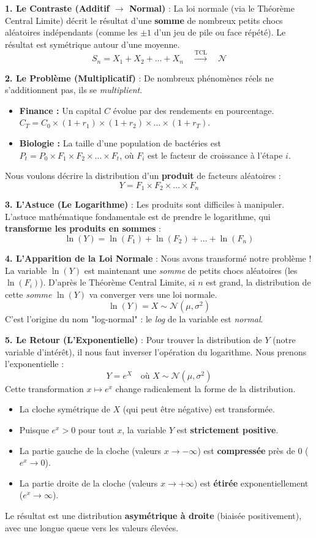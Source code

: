 \begin{intuitionbox}
\textbf{1. Le Contraste (Additif $\to$ Normal)} :
La loi normale (via le Théorème Central Limite) décrit le résultat d'une \textbf{somme} de nombreux petits chocs aléatoires indépendants (comme les $\pm 1$ d'un jeu de pile ou face répété). Le résultat est symétrique autour d'une moyenne.
$$ S_n = X_1 + X_2 + \ldots + X_n \quad \xrightarrow{\text{TCL}} \quad \mathcal{N} $$

\textbf{2. Le Problème (Multiplicatif)} :
De nombreux phénomènes réels ne s'additionnent pas, ils se \textit{multiplient}.
\begin{itemize}
    \item \textbf{Finance :} Un capital $C$ évolue par des rendements en pourcentage. $C_T = C_0 \times (1+r_1) \times (1+r_2) \times \ldots \times (1+r_T)$.
    \item \textbf{Biologie :} La taille d'une population de bactéries est $P_t = P_0 \times F_1 \times F_2 \times \ldots \times F_t$, où $F_i$ est le facteur de croissance à l'étape $i$.
\end{itemize}
Nous voulons décrire la distribution d'un \textbf{produit} de facteurs aléatoires :
$$ Y = F_1 \times F_2 \times \ldots \times F_n $$

\textbf{3. L'Astuce (Le Logarithme)} :
Les produits sont difficiles à manipuler. L'astuce mathématique fondamentale est de prendre le logarithme, qui \textbf{transforme les produits en sommes} :
$$ \ln(Y) = \ln(F_1) + \ln(F_2) + \ldots + \ln(F_n) $$

\textbf{4. L'Apparition de la Loi Normale} :
Nous avons transformé notre problème ! La variable $\ln(Y)$ est maintenant une \textit{somme} de petits chocs aléatoires (les $\ln(F_i)$). D'après le Théorème Central Limite, si $n$ est grand, la distribution de cette \textit{somme} $\ln(Y)$ va converger vers une loi normale.
$$ \ln(Y) = X \sim \mathcal{N}(\mu, \sigma^2) $$
C'est l'origine du nom "log-normal" : le \textit{log} de la variable est \textit{normal}.

\textbf{5. Le Retour (L'Exponentielle)} :
Pour trouver la distribution de $Y$ (notre variable d'intérêt), il nous faut inverser l'opération du logarithme. Nous prenons l'exponentielle :
$$ Y = e^X \quad \text{où } X \sim \mathcal{N}(\mu, \sigma^2) $$
Cette transformation $x \mapsto e^x$ change radicalement la forme de la distribution.
\begin{itemize}
    \item La cloche symétrique de $X$ (qui peut être négative) est transformée.
    \item Puisque $e^x > 0$ pour tout $x$, la variable $Y$ est \textbf{strictement positive}.
    \item La partie gauche de la cloche (valeurs $x \to -\infty$) est \textbf{compressée} près de $0$ ($e^x \to 0$).
    \item La partie droite de la cloche (valeurs $x \to +\infty$) est \textbf{étirée} exponentiellement ($e^x \to \infty$).
\end{itemize}
Le résultat est une distribution \textbf{asymétrique à droite} (biaisée positivement), avec une longue queue vers les valeurs élevées.


\end{intuitionbox}

